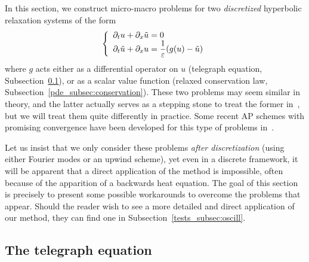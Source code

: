 In this section, we construct micro-macro problems for two
\textit{discretized} hyperbolic relaxation systems of the form
$$ 
\left\{ \begin{array}{l}
\partial_t u + \partial_{x} \tilde{u} = 0 \\ \displaystyle
\partial_t \tilde{u} + \partial_{x} u = \frac{1}{\varepsilon}(g(u) - \tilde{u})
\end{array} \right .
$$
where $g$ acts either as a differential operator on $u$ (telegraph
equation, Subsection~\ref{pde_subsec:telegraph}), or as a scalar value
function (relaxed conservation law,
Subsection~\ref{pde_subsec:conservation}). These two problems may seem
similar in theory, and the latter actually serves as a stepping stone to
treat the former in~\cite{jin.1998.diffusive, jin.2000.uniformly}, but we will
treat them quite differently in practice. Some recent AP schemes with
promising convergence have been developed for this type of problems
in~\cite{boscarino.2017.unified, albi.2020.implicit}.

Let us insist that we only consider these problems \textit{after
discretization} (using either Fourier modes or an upwind scheme), yet even
in a discrete framework, it will be apparent that a direct application of
the method is impossible, often because of the apparition of a backwards
heat equation. The goal of this section is precisely to present some
possible workarounds to overcome the problems that appear. 
%
Should the reader wish to see a more detailed and direct application of
our method, they can find one in Subsection~\ref{tests_subsec:oscill}. 


\subsection{The telegraph equation}
\label{pde_subsec:telegraph}
\newcommand{\xvar}{\rho}
\newcommand{\zvar}{z}

